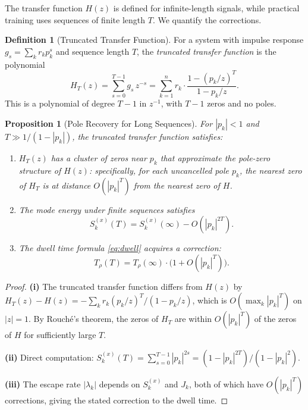 \documentclass[11pt,a4paper]{article}
\newtheorem{proposition}[theorem]{Proposition}
\theoremstyle{definition}
\newtheorem{definition}[theorem]{Definition}
\begin{document}
The transfer function $H(z)$ is defined for infinite-length
signals, while practical training uses sequences of finite
length $T$. We quantify the corrections.

\begin{definition}[Truncated Transfer Function]\label{def:truncated}
For a system with impulse response $g_s = \sum_k r_k p_k^s$
and sequence length $T$, the \emph{truncated transfer function}
is the polynomial
\begin{equation}
  H_T(z) = \sum_{s=0}^{T-1} g_s\, z^{-s}
  = \sum_{k=1}^n r_k \cdot \frac{1 - (p_k/z)^T}{1 - p_k/z}.
\end{equation}
This is a polynomial of degree $T-1$ in $z^{-1}$, with $T-1$
zeros and no poles.
\end{definition}

\begin{proposition}[Pole Recovery for Long Sequences]%
\label{prop:finite}
For $|p_k| < 1$ and $T \gg 1/(1-|p_k|)$, the truncated transfer
function satisfies:
\begin{enumerate}[label=(\roman*)]
  \item $H_T(z)$ has a cluster of zeros near $p_k$ that
    approximate the pole-zero structure of $H(z)$: specifically,
    for each uncancelled pole $p_k$, the nearest zero of $H_T$
    is at distance $O(|p_k|^T)$ from the nearest zero of $H$.
  \item The mode energy under finite sequences satisfies
    \begin{equation}
      S_k^{(x)}(T) = S_k^{(x)}(\infty) - O(|p_k|^{2T}).
    \end{equation}
  \item The dwell time formula \eqref{eq:dwell} acquires a
    correction:
    \begin{equation}
      T_\rho(T) = T_\rho(\infty)\cdot
      \bigl(1 + O(|p_k|^T)\bigr).
    \end{equation}
\end{enumerate}
\end{proposition}

\begin{proof}
\textbf{(i)} The truncated transfer function differs from
$H(z)$ by
$H_T(z) - H(z) = -\sum_k r_k (p_k/z)^T / (1 - p_k/z)$,
which is $O(\max_k|p_k|^T)$ on $|z| = 1$. By Rouch\'{e}'s
theorem, the zeros of $H_T$ are within $O(|p_k|^T)$ of the
zeros of $H$ for sufficiently large $T$.

\textbf{(ii)} Direct computation:
$S_k^{(x)}(T) = \sum_{s=0}^{T-1}|p_k|^{2s}
= (1-|p_k|^{2T})/(1-|p_k|^2)$.

\textbf{(iii)} The escape rate $|\lambda_k|$ depends on
$S_k^{(x)}$ and $J_k$, both of which have $O(|p_k|^T)$
corrections, giving the stated correction to the dwell time.
\end{proof}
\end{document}
